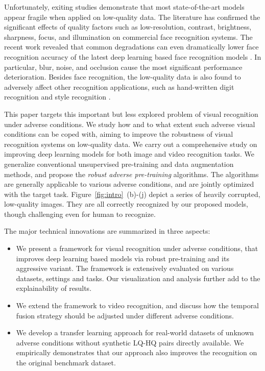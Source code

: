 \documentclass[10pt,twocolumn,twoside]{IEEEtran} %
\begin{document}
Unfortunately, exiting studies demonstrate that most state-of-the-art models appear fragile when applied on low-quality data.
The literature \cite{DVS12, ab14} has confirmed the significant effects of quality factors such as low-resolution, contrast, brightness, sharpness, focus, and illumination on commercial face recognition systems. 
The recent work \cite{karahan2016image} revealed that common degradations can even dramatically lower face recognition accuracy of the latest deep learning based face recognition models \cite{Alex, parkhi2015deep, szegedy2015going}. 
In particular, blur, noise, and %
occlusion cause the most significant performance deterioration.
Besides face recognition, the low-quality data is also found to adversely affect other recognition applications, such as hand-written digit recognition \cite{basu2015learning} and style recognition \cite{vlrr}. 

 
This paper targets this important but less explored problem of visual recognition under adverse conditions. 
We study how and to what extent such adverse visual conditions can be coped with, aiming to improve the robustness of visual recognition systems on low-quality data. 
We carry out a comprehensive study on improving deep learning models for both image and video recognition tasks. 
We generalize conventional unsupervised pre-training and data augmentation methods, and propose the \textit{robust adverse pre-training} algorithms. 
The algorithms are generally applicable to various adverse conditions, and are jointly optimized with the target task. 
Figure~\ref{fig:intro}~(b)-(j) depict a series of heavily corrupted, low-quality images.  
They are all correctly recognized by our proposed models, though challenging even for human to recognize.

The major technical innovations are summarized in three aspects:
\begin{itemize}
	\item We present a framework for visual recognition under adverse conditions, that improves deep learning based models via robust pre-training and its aggressive variant. The framework is extensively evaluated on various datasets, settings and tasks. Our visualization and analysis further add to the explainability of results.
	\item We extend the framework to video recognition, and discuss how the temporal fusion strategy should be adjusted under different adverse conditions. 
	\item We develop a transfer learning approach for real-world datasets of unknown adverse conditions without synthetic LQ-HQ pairs directly available. We empirically demonstrates that our approach also improves the recognition on the original benchmark dataset. 
\end{itemize}%
\end{document}
